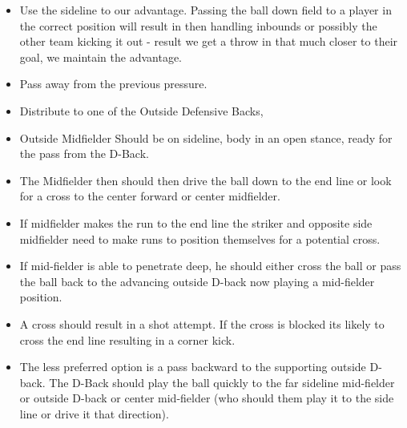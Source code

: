 \documentclass[10pt,letterpaper]{article}
\newenvironment{oddBlock}[1]{%
    \tcolorbox[beamer,%
    noparskip,breakable,
    colback=LightBlue,colframe=DarkBlue,%
    colbacklower=DarkBlue!75!LightBlue,%
    title=#1]}%
    {\endtcolorbox}
\begin{document}
\begin{oddBlock}{Basic Tactics}
\begin{itemize}
        \item Use the sideline to our advantage. Passing the ball down field to a player in the correct position will result in then handling inbounds or possibly the other team kicking it out - result we get a throw in that much closer to their goal, we maintain the advantage.
        \item Pass away from the previous pressure.
    \end{itemize}
\end{oddBlock}

\begin{oddBlock}{Keeper Distribution}
    \begin{itemize}
        \item Distribute to one of the Outside Defensive Backs,
        \item Outside Midfielder Should be on sideline, body in an open stance, ready for the pass from the D-Back.
        \item The Midfielder then should then drive the ball down to the end line or look for a cross to the center forward or center midfielder.
        \item If midfielder makes the run to the end line the striker and opposite side midfielder need to make runs to position themselves for a potential cross. 
        \item If mid-fielder is able to penetrate deep, he should either cross the ball or pass the ball back to the advancing outside D-back now playing a mid-fielder position.
        \item  A cross should result in a shot attempt.  If the cross is blocked its likely to cross the end line resulting in a corner kick.
        \item The less preferred option is a pass backward to the supporting outside D-back.  The D-Back should play the ball quickly to the far sideline mid-fielder or outside D-back or center mid-fielder (who should them play it to the side line or drive it that direction).
    \end{itemize}
\end{oddBlock}
\end{document}
